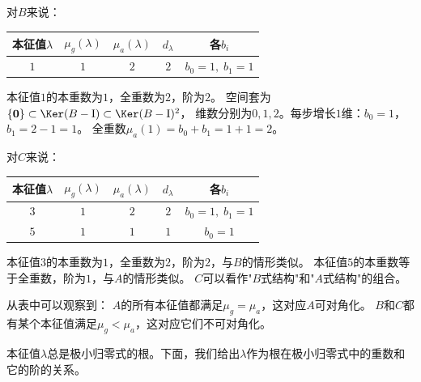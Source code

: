 \documentclass[12pt,UTF8]{ctexbook}
\begin{document}
对$B$来说：
\begin{center}
\begin{tabular}{c|c|c|c|c}
本征值$\lambda$ & $\mu_g(\lambda)$ & $\mu_a(\lambda)$ & $d_\lambda$ & 各$b_i$ \\
\hline
$1$ & $1$ & $2$ & $2$ & $b_0 = 1,\; b_1 = 1$ \\
\end{tabular}
\end{center}
本征值$1$的本重数为$1$，全重数为$2$，阶为$2$。
空间套为$\{\mathbf{0}\} \subset \Ker(B-\mathrm{I}) \subset \Ker(B-\mathrm{I})^2$，
维数分别为$0, 1, 2$。每步增长$1$维：$b_0 = 1$，$b_1 = 2 - 1 = 1$。
全重数$\mu_a(1) = b_0 + b_1 = 1 + 1 = 2$。

对$C$来说：
\begin{center}
\begin{tabular}{c|c|c|c|c}
本征值$\lambda$ & $\mu_g(\lambda)$ & $\mu_a(\lambda)$ & $d_\lambda$ & 各$b_i$ \\
\hline
$3$ & $1$ & $2$ & $2$ & $b_0 = 1,\; b_1 = 1$ \\
$5$ & $1$ & $1$ & $1$ & $b_0 = 1$ \\
\end{tabular}
\end{center}
本征值$3$的本重数为$1$，全重数为$2$，阶为$2$，与$B$的情形类似。
本征值$5$的本重数等于全重数，阶为$1$，与$A$的情形类似。
$C$可以看作"$B$式结构"和"$A$式结构"的组合。

从表中可以观察到：
$A$的所有本征值都满足$\mu_g = \mu_a$，这对应$A$可对角化。
$B$和$C$都有某个本征值满足$\mu_g < \mu_a$，这对应它们不可对角化。

本征值$\lambda$总是极小归零式的根。下面，我们给出$\lambda$作为根在极小归零式中的重数和它的阶的关系。
\end{document}
